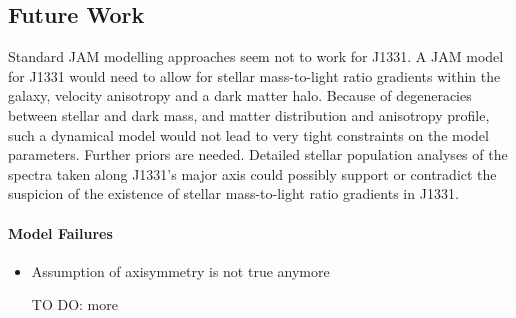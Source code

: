 \subsection{Future Work}

Standard JAM modelling approaches seem not to work for J1331. A JAM model for J1331 would need to allow for stellar mass-to-light ratio gradients within the galaxy, velocity anisotropy and a dark matter halo. Because of degeneracies between stellar and dark mass, and matter distribution and anisotropy profile, such a dynamical model would not lead to very tight constraints on the model parameters. Further priors are needed. Detailed stellar population analyses of the spectra taken along J1331's major axis could possibly support or contradict the suspicion of the existence of stellar mass-to-light ratio gradients in J1331.

\paragraph{Model Failures}
\begin{itemize}
\item Assumption of axisymmetry is not true anymore
\item [TO DO: more]
\end{itemize}
